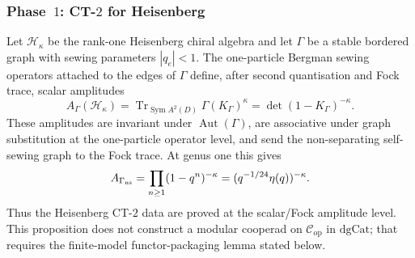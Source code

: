 \documentclass[11pt]{article}
\newcommand{\cC}{\mathcal{C}}
\newcommand{\cH}{\mathcal{H}}
\begin{document}
\subsubsection*{Phase~$1$: CT-$2$ for Heisenberg}
\label{par:ct2-phase1}

\begin{proposition}
\label{prop:heisenberg-determinant-valued-clutching}
Let $\cH_\kappa$ be the rank-one Heisenberg chiral algebra and
let $\Gamma$ be a stable bordered graph with sewing parameters
$|q_e|<1$.  The one-particle Bergman sewing operators attached
to the edges of $\Gamma$ define, after second quantisation and
Fock trace, scalar amplitudes
\[
  A_\Gamma(\cH_\kappa)
  =
  \operatorname{Tr}_{\operatorname{Sym} A^2(D)}
  \Gamma(K_\Gamma)^\kappa
  =
  \det(1-K_\Gamma)^{-\kappa}.
\]
These amplitudes are invariant under $\operatorname{Aut}(\Gamma)$,
are associative under graph substitution at the one-particle
operator level, and send the non-separating self-sewing graph to
the Fock trace.  At genus one this gives
\[
  A_{\Gamma_{\rm ns}}
  =
  \prod_{n\ge1}(1-q^n)^{-\kappa}
  =
  (q^{-1/24}\eta(q))^{-\kappa}.
\]
Thus the Heisenberg CT-$2$ data are proved at the scalar/Fock
amplitude level.  This proposition does not construct a modular
cooperad on $\cC_{\mathrm{op}}$ in $\mathrm{dgCat}$; that
requires the finite-model functor-packaging lemma stated below.
\end{proposition}
\end{document}
